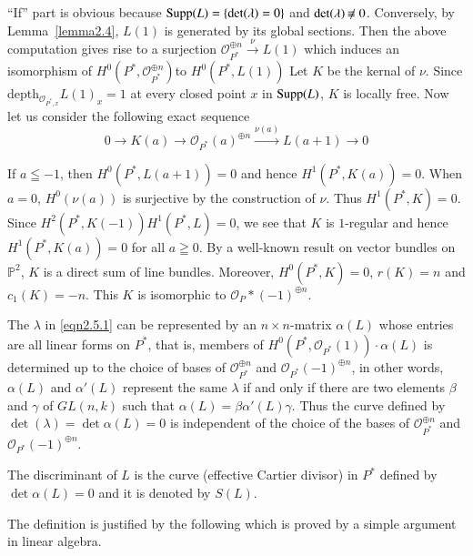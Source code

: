 \begin{Proof}
``If'' part is obvious because $\mathrm{Supp}(L)=\{\det(\lambda)=0\}$ and
 $\det(\lambda)\not\kern-1pt\equiv 0$. Conversely, by Lemma~\ref{lemma2.4},
 $L(1)$ is generated by its global sections. Then the above
 computation gives rise to a surjection
 $\mathscr{O}_{P^{\ast}}^{\oplus n}\xrightarrow{\nu}L(1)$ which
 induces an isomorphism of
 $H^{0}\left(P^{\ast},\mathscr{O}_{P^{\ast}}^{\oplus n}\right)$\pageoriginale to
 $H^{0}\left(P^{\ast},L(1)\right)$ Let $K$ be the kernal of
 $\nu$. Since depth$_{\mathscr{O}_{P^{\ast},x}}L(1)_x=1$ at every
 closed point $x$ in $\mathrm{Supp}(L)$, $K$ is locally free. Now let us
 consider the following exact sequence
$$
0\to K(a)\to \mathscr{O}_{P^{\ast}}(a)^{\oplus
  n}\xrightarrow{\nu(a)}L(a+1)\to 0
$$

If $a\leqq -1$, then $H^{0}\left(P^{\ast},L(a+1)\right)=0$ and hence
$H^{1}\left(P^{\ast},K(a)\right)=0$. When $a=0$, $H^{0}(\nu (a))$ is
surjective by the construction of $\nu$. Thus
$H^{1}\left(P^{\ast},K\right)=0$. Since $H^{2}\left(P^{*},K(-1)\right)
H^{1}\left(P^{\ast},L\right)=0$, we see that $K$ is $1$-regular and hence
$H^{1}(P^{\ast},K(a))=0$ for all $a\geqq 0$. By a well-known result on
vector bundles on $\mathbb{P}^{2}$, $K$ is a direct sum of line
bundles. Moreover, $H^{0}(P^{\ast},K)=0$, $r(K)=n$ and
$c_1(K)=-n$. This $K$ is isomorphic to
$\mathscr{O}_{P}\ast(-1)^{\oplus n}$.
\enprf
\end{Proof}

The $\lambda$ in \eqref{eqn2.5.1} can be represented by an $n\times
n$-matrix $\alpha(L)$ whose entries are all linear forms on $P^{\ast}$,
that is, members of $H^{0}(P^{\ast},\mathscr{O}_{P^{\ast}}(1))\cdot
\alpha(L)$ is determined up to the choice of bases of
$\mathscr{O}_{P^{\ast}}^{\oplus n}$ and
$\mathscr{O}_{P^{\ast}}(-1)^{\oplus n}$, in other words, $\alpha(L)$
and $\alpha'(L)$ represent the same $\lambda$ if and only if there are
two elements $\beta$ and $\gamma$ of $GL(n,k)$  such that
$\alpha(L)=\beta\alpha'(L)\gamma$. Thus the curve defined by
$\det(\lambda)=\det\alpha(L)=0$ is independent of the choice of the
bases of $\mathscr{O}_{P^{\ast}}^{\oplus n}$ and
$\mathscr{O}_{P^{\ast}}(-1)^{\oplus n}$. 

\begin{dfn}\label{dfn2.6}
The discriminant of $L$ is the curve (effective Cartier divisor) in
$P^{\ast}$ defined by $\det\alpha(L)=0$ and it is denoted by $S(L)$. 
\end{dfn}

The definition is justified by the following which is proved by a
simple argument in linear algebra.

